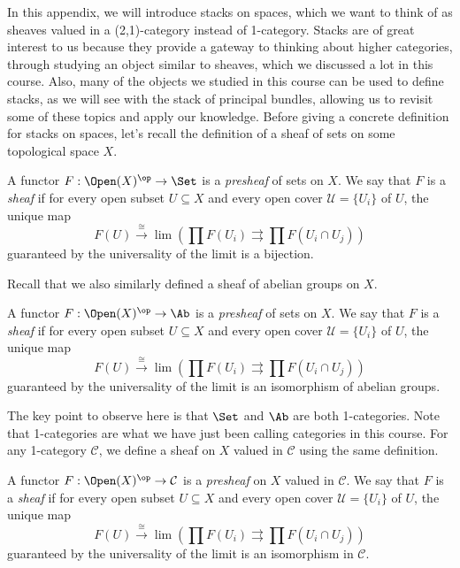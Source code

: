 In this appendix, we will introduce stacks on spaces, which we want to think of as sheaves valued in a (2,1)-category instead of 1-category. Stacks are of great interest to us because they provide a gateway to thinking about higher categories, through studying an object similar to sheaves, which we discussed a lot in this course. Also, many of the objects we studied in this course can be used to define stacks, as we will see with the stack of principal bundles, allowing us to revisit some of these topics and apply our knowledge. Before giving a concrete definition for stacks on spaces, let's recall the definition of a sheaf of sets on some topological space $X$.
\begin{definition}
A functor $F: \Open(X)^{\op} \to \Set$ is a \textit{presheaf} of sets on $X$. We say that $F$ is a \textit{sheaf} if for every open subset $U \subseteq X$ and every open cover $\mathcal{U} = \{U_i\}$ of $U$, the unique map
$$
F(U) \xrightarrow{\cong} \lim \left( \prod F(U_i) \rightrightarrows \prod F(U_i \cap U_j) \right)
$$
guaranteed by the universality of the limit is a bijection.
\end{definition}
Recall that we also similarly defined a sheaf of abelian groups on $X$.
\begin{definition}
A functor $F: \Open(X)^{\op} \to \Ab$ is a \textit{presheaf} of sets on $X$. We say that $F$ is a \textit{sheaf} if for every open subset $U \subseteq X$ and every open cover $\mathcal{U} = \{U_i\}$ of $U$, the unique map
$$
F(U) \xrightarrow{\cong} \lim \left( \prod F(U_i) \rightrightarrows \prod F(U_i \cap U_j) \right)
$$
guaranteed by the universality of the limit is an isomorphism of abelian groups.
\end{definition}
\begin{remark}
The key point to observe here is that $\Set$ and $\Ab$ are both 1-categories. Note that 1-categories are what we have just been calling categories in this course. For any 1-category $\mathcal{C}$, we define a sheaf on $X$ valued in $\mathcal{C}$ using the same definition.
\end{remark}
\begin{definition}
A functor $F: \Open(X)^{\op} \to \mathcal{C}$ is a \textit{presheaf} on $X$ valued in $\mathcal{C}$. We say that $F$ is a \textit{sheaf} if for every open subset $U \subseteq X$ and every open cover $\mathcal{U} = \{U_i\}$ of $U$, the unique map
$$
F(U) \xrightarrow{\cong} \lim \left( \prod F(U_i) \rightrightarrows \prod F(U_i \cap U_j) \right)
$$
guaranteed by the universality of the limit is an isomorphism in $\mathcal{C}$.
\end{definition}
